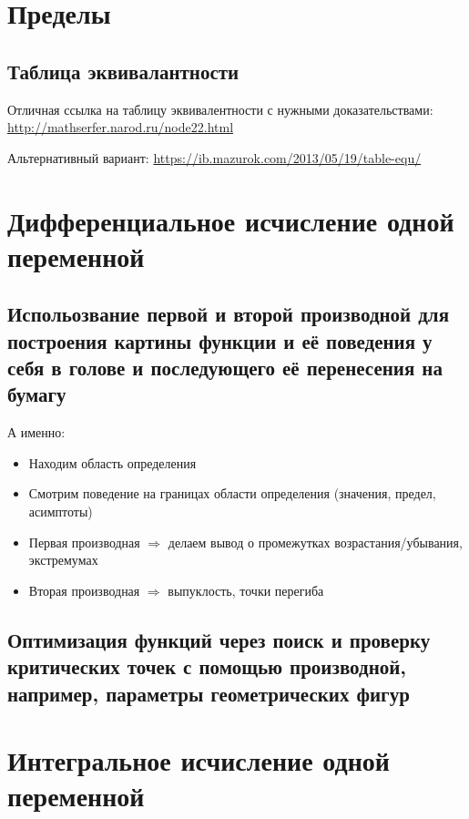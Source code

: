 \documentclass[12pt, a4paper]{article}
\begin{document}
\section{Пределы}

  \subsection{Таблица эквивалантности}
  Отличная ссылка на таблицу эквивалентности с нужными доказательствами: 
  \url{http://mathserfer.narod.ru/node22.html}

  Альтернативный вариант:
  \url{https://ib.mazurok.com/2013/05/19/table-equ/} 


\section{Дифференциальное исчисление одной переменной}

  \subsection{Испольозвание первой и второй производной для построения картины функции и её поведения 
    у себя в голове и последующего её перенесения на бумагу}

    А именно: 

    \begin{itemize}
      \item Находим область определения
      \item Смотрим поведение на границах области определения (значения, предел, асимптоты)
      \item Первая производная $\Longrightarrow$ делаем вывод о промежутках возрастания/убывания, экстремумах
      \item Вторая производная $\Longrightarrow$ выпуклость, точки перегиба
    \end{itemize}

    \subsection{Оптимизация функций через поиск и проверку критических точек с помощью производной, например, параметры геометрических фигур}

\section{Интегральное исчисление одной переменной}
\end{document}
